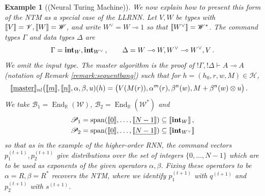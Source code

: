\documentclass[english,letter paper,12pt,leqno]{article}
\theoremstyle{example}
\newtheorem{example}[theorem]{Example}
\numberwithin{equation}{section}
\DeclareMathOperator{\End}{End}
\begin{document}
\begin{example}[(Neural Turing Machine)]
We now explain how to present this form of the NTM as a special case of the LLRNN. Let $V,W$ be types with $\llbracket V \rrbracket = \mathscr{V}, \llbracket W \rrbracket = \mathscr{W}$, and write $W^{\vee} = W \multimap 1$ so that $\llbracket W^{\vee} \rrbracket = \mathscr{W}^*$. The command types $\Gamma$ and data types $\Delta$ are
\[
\Gamma = \textbf{int}_W, \textbf{int}_{W^{\vee}}\,, \qquad \Delta = W \multimap W, W^{\vee} \multimap W^{\vee}, V\,.
\]
We omit the input type. The master algorithm is the proof of ${!} \Gamma, {!} \Delta \vdash A \multimap A$ (notation of Remark \ref{remark:sequentbang}) such that for $h = (h_0,r,w,M) \in \mathscr{H}$,
\begin{align*}
\llbracket \underline{\textup{master}} \rrbracket_{nl}&\big( \llbracket \underline{m} \rrbracket, \llbracket \underline{n} \rrbracket, \alpha, \beta, u )(h) = \big(V(M(r)), \alpha^m(r), \beta^n(w), M + \beta^n(w) \otimes u\big)\,.
\end{align*}
We take $\mathscr{B}_1 = \End_{\mathbb{R}}(\mathscr{W})$, $\mathscr{B}_2 = \End_{\mathbb{R}}(\mathscr{W}^*)$ and
\begin{align*}
\mathscr{P}_1 &= \operatorname{span}(\llbracket \underline{0} \rrbracket, \ldots, \llbracket \underline{N-1} \rrbracket) \subseteq \llbracket \textbf{int}_W \rrbracket\,,\\
\mathscr{P}_2 &= \operatorname{span}(\llbracket \underline{0} \rrbracket, \ldots, \llbracket \underline{N-1} \rrbracket) \subseteq \llbracket \textbf{int}_{W^{\vee}} \rrbracket
\end{align*}
so that as in the example of the higher-order RNN, the command vectors $p_1^{(t+1)}, p_2^{(t+1)}$ give distributions over the set of integers $\{0,\ldots,N-1\}$ which are to be used as exponents of the given operators $\alpha, \beta$. Fixing these operators to be $\alpha = R, \beta = R^*$ recovers the NTM, where we identify $p_1^{(t+1)}$ with $q^{(t+1)}$ and $p_2^{(t+1)}$ with $s^{(t+1)}$.
\end{example}
\end{document}
